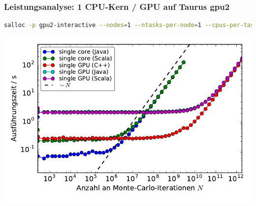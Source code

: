 \begin{frame}[fragile]
    \frametitle{Leistungsanalyse: 1 CPU-Kern / GPU auf Taurus gpu2}
    \begin{lstlisting}[language=bash,breakautoindent=false,numbers=none]
salloc -p gpu2-interactive --nodes=1 --ntasks-per-node=1 --cpus-per-task=1 --gres=gpu:1 --time=02:00:00
\end{lstlisting}\vspace{-1.5\baselineskip}
    \centerline{\includegraphics[width=0.9\linewidth]{benchmarks-workload-scaling.pdf}}
\end{frame}

